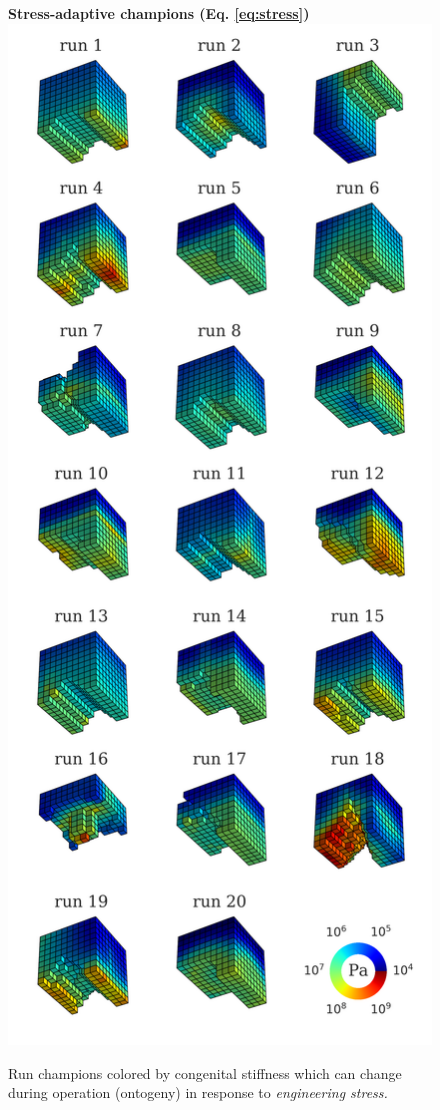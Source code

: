 \begin{figure}%
\centering
{\Large \textbf{Stress-adaptive champions (Eq. \ref{eq:stress})}}
\includegraphics[width=0.5\linewidth]{Chapter06/img/stress_run_champs}
\caption{\label{fig:stress} Run champions colored by congenital stiffness which can change during operation (ontogeny) in response to \textit{engineering stress.}}
\end{figure}

